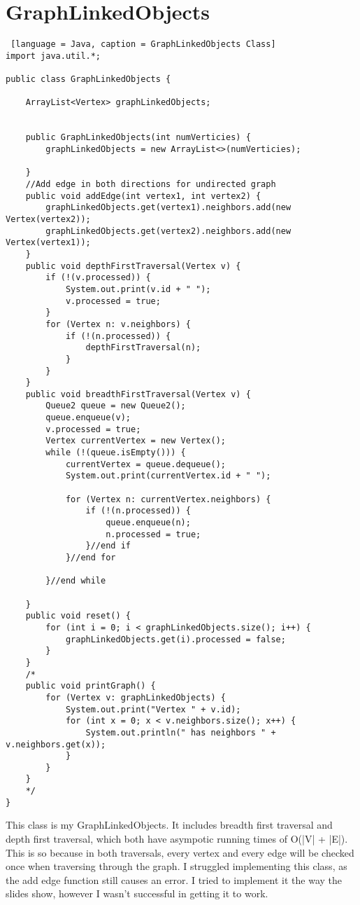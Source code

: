 \documentclass{article}
\begin{document}
\section{GraphLinkedObjects}

\begin{lstlisting} [language = Java, caption = GraphLinkedObjects Class]
import java.util.*;

public class GraphLinkedObjects {
    
    ArrayList<Vertex> graphLinkedObjects;
    

    public GraphLinkedObjects(int numVerticies) {
        graphLinkedObjects = new ArrayList<>(numVerticies);
        
    }
    //Add edge in both directions for undirected graph
    public void addEdge(int vertex1, int vertex2) {
        graphLinkedObjects.get(vertex1).neighbors.add(new Vertex(vertex2));
        graphLinkedObjects.get(vertex2).neighbors.add(new Vertex(vertex1));
    }
    public void depthFirstTraversal(Vertex v) {
        if (!(v.processed)) {
            System.out.print(v.id + " ");
            v.processed = true;
        }
        for (Vertex n: v.neighbors) {
            if (!(n.processed)) {
                depthFirstTraversal(n);
            }
        }
    }
    public void breadthFirstTraversal(Vertex v) {
        Queue2 queue = new Queue2();
        queue.enqueue(v);
        v.processed = true;
        Vertex currentVertex = new Vertex();
        while (!(queue.isEmpty())) {
            currentVertex = queue.dequeue();
            System.out.print(currentVertex.id + " ");

            for (Vertex n: currentVertex.neighbors) {
                if (!(n.processed)) {
                    queue.enqueue(n);
                    n.processed = true;
                }//end if
            }//end for
            
        }//end while
        
    }
    public void reset() {
        for (int i = 0; i < graphLinkedObjects.size(); i++) {
            graphLinkedObjects.get(i).processed = false;
        }
    }
    /*
    public void printGraph() {
        for (Vertex v: graphLinkedObjects) {
            System.out.print("Vertex " + v.id);
            for (int x = 0; x < v.neighbors.size(); x++) {
                System.out.println(" has neighbors " + v.neighbors.get(x));
            }
        }
    }
    */
}

\end{lstlisting}
\noindent This class is my GraphLinkedObjects. It includes breadth first traversal and depth first traversal, which both have asympotic running times of O(|V| + |E|). This is so because in both traversals, every vertex and every edge will be checked once when traversing through the graph. I struggled implementing this class, as the add edge function still causes an error. I tried to implement it the way the slides show, however I wasn't successful in getting it to work.
\end{document}
